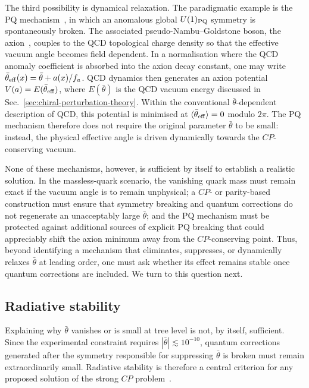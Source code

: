 \documentclass[review]{elsarticle}
\numberwithin{equation}{section}
\numberwithin{table}{section}
\numberwithin{figure}{section}
\begin{document}
The third possibility is dynamical relaxation. The paradigmatic example is the PQ mechanism~\cite{Peccei:1977hh}, in which an anomalous global $U(1)_{\rm PQ}$ symmetry is spontaneously broken. The associated pseudo-Nambu--Goldstone boson, the axion~\cite{Weinberg:1977ma,Wilczek:1977pj}, couples to the QCD topological charge density so that the effective vacuum angle becomes field dependent. In a normalisation where the QCD anomaly coefficient is absorbed into the axion decay constant, one may write $\bar\theta_{\rm eff}(x)=\bar\theta+a(x)/f_a$. QCD dynamics then generates an axion potential $V(a)=E(\bar\theta_{\rm eff})$, where $E(\bar\theta)$ is the QCD vacuum energy discussed in Sec.~\ref{sec:chiral-perturbation-theory}. Within the conventional $\bar\theta$-dependent description of QCD, this potential is minimised at $\langle\bar\theta_{\rm eff}\rangle=0$ modulo $2\pi$. The PQ mechanism therefore does not require the original parameter $\bar\theta$ to be small: instead, the physical effective angle is driven dynamically towards the $CP$-conserving vacuum.

None of these mechanisms, however, is sufficient by itself to establish a realistic solution. In the massless-quark scenario, the vanishing quark mass must remain exact if the vacuum angle is to remain unphysical; a $CP$- or parity-based construction must ensure that symmetry breaking and quantum corrections do not regenerate an unacceptably large $\bar\theta$; and the PQ mechanism must be protected against additional sources of explicit PQ breaking that could appreciably shift the axion minimum away from the $CP$-conserving point. Thus, beyond identifying a mechanism that eliminates, suppresses, or dynamically relaxes $\bar\theta$ at leading order, one must ask whether its effect remains stable once quantum corrections are included. We turn to this question next.


\subsection{Radiative stability}
\label{sec:radiative-stability}

Explaining why $\bar\theta$ vanishes or is small at tree level is not, by itself, sufficient. Since the experimental constraint requires $|\bar\theta|\lesssim10^{-10}$, quantum corrections generated after the symmetry responsible for suppressing $\bar\theta$ is broken must remain extraordinarily small. Radiative stability is therefore a central criterion for any proposed solution of the strong $CP$ problem~\cite{Cheng:1987gp,Hook:2018dlk}.
\end{document}
